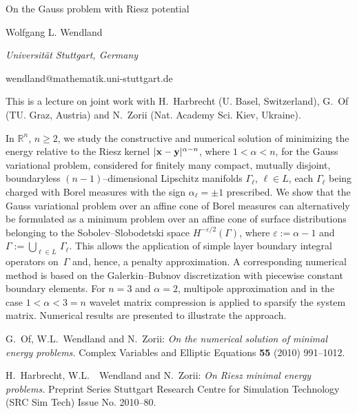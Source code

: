 \documentclass[10pt,a4paper]{article}
\begin{document}
\begin{center}

{\Large On the Gauss problem with Riesz  potential}

\bigskip

{\sc Wolfgang L. Wendland}

{\small\it Universit{\"a}t Stuttgart, Germany}

{\small\rm wendland@mathematik.uni-stuttgart.de}


\end{center}

\bigskip


This is a lecture on joint work with H.~Harbrecht (U. Basel,
Switzerland), G.~Of (TU. Graz, Austria) and
N.~Zorii (Nat. Academy Sci. Kiev, Ukraine).

In $\mathbb R^n$, $n\geqslant 2$, we study the constructive and
numerical solution of minimizing the energy relative to the Riesz
kernel $|{\bf x}-{\bf y}|^{\alpha-n}$, where $1<\alpha<n$, for the
Gauss variational problem, considered for finitely many compact,
mutually disjoint, boundaryless $(n-1)$--dimensional
Lipschitz manifolds $\Gamma_\ell$, $\ell\in L$, each $\Gamma_\ell$
being charged with Borel measures with the sign $\alpha_\ell=\pm1$
prescribed. We show that the Gauss variational problem over an
affine cone of Borel measures can alternatively be formulated as a
minimum problem over an affine cone of surface distributions
belonging to the Sobolev--Slobodetski space
$H^{-{\varepsilon}/{2}}(\Gamma)$, where $\varepsilon:=\alpha-1$ and
$\Gamma:=\bigcup_{\ell\in L}\,\Gamma_\ell$. This allows the
application of simple layer boundary integral operators on~$\Gamma$
and, hence, a penalty approximation. A corresponding numerical
method is based on the Galerkin--Bubnov discretization with
piecewise constant boundary elements. For $n=3$ and  $\alpha=2$, multipole
approximation and in the case  $1<\alpha<3=n$  wavelet matrix compression is
applied to sparsify the system matrix.  Numerical results are
presented to illustrate the approach.


\begin{thebibliography}{6}

G.~Of, W.L.~Wendland and N.~Zorii:
\textsl{On the numerical solution of minimal energy problems.}
Complex Variables and Elliptic Equations \textbf{55} (2010)
991--1012.

H.~Harbrecht, W.L.~~Wendland and N.~Zorii:
\textsl{On Riesz minimal energy problems.}
Preprint Series Stuttgart Research Centre for Simulation Technology
(SRC Sim Tech) Issue No. 2010--80.

\end{thebibliography}
\end{document}
